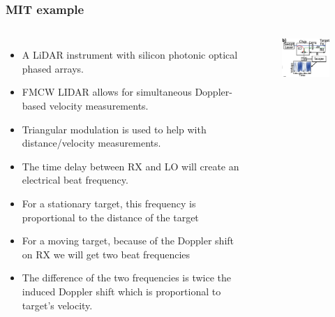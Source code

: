 \documentclass{beamer}
\begin{document}
%
\begin{frame}
\frametitle{MIT example}
\begin{columns}[c] %

\begin{itemize}
\item A LiDAR instrument with silicon photonic optical phased arrays.
\item FMCW LIDAR allows for simultaneous Doppler-based velocity measurements.
\item Triangular modulation is used to help with distance/velocity measurements.
\item The time delay between RX and LO will create an electrical beat frequency.
\item For a stationary target, this frequency is proportional to the distance of the target
\item For a moving target, because of the Doppler shift on RX we will get two beat frequencies
\item The difference of the two frequencies is twice the induced Doppler shift which is proportional to target's velocity.
\end{itemize}
   \begin{figure}[htbp]
    \begin{center}
    \includegraphics[width=4cm]{graphs/pic0}
    \caption{\cite{pic0}}
    \label{default}
    \end{center}
    \end{figure}

\end{columns}

\end{frame}




\end{document}
